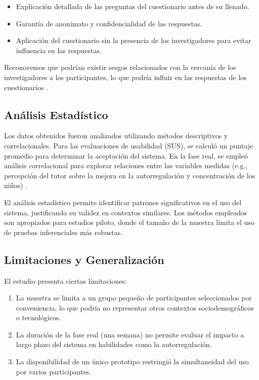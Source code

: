 \documentclass[a4paper,fleqn]{cas-sc}
\begin{document}
			\begin{itemize}
				\item Explicación detallada de las preguntas del cuestionario antes de su llenado.
				\item Garantía de anonimato y confidencialidad de las respuestas.
				\item Aplicación del cuestionario sin la presencia de los investigadores para evitar influencia en las respuestas.
			\end{itemize}
				
			Reconocemos que podrían existir sesgos relacionados con la cercanía de los investigadores a los participantes, lo que podría influir en las respuestas de los cuestionarios \citep{DiPietro2025Meta}.
			
		\subsection{Análisis Estadístico}
			Los datos obtenidos fueron analizados utilizando métodos descriptivos y correlacionales. Para las evaluaciones de usabilidad (SUS), se calculó un puntaje promedio para determinar la aceptación del sistema. En la fase real, se empleó análisis correlacional para explorar relaciones entre las variables medidas (e.g., percepción del tutor sobre la mejora en la autorregulación y concentración de los niños) \citep{Wang2025Development}.
				
			El análisis estadístico permite identificar patrones significativos en el uso del sistema, justificando su validez en contextos similares. Los métodos empleados son apropiados para estudios piloto, donde el tamaño de la muestra limita el uso de pruebas inferenciales más robustas.
			
		\subsection{Limitaciones y Generalización}
			El estudio presenta ciertas limitaciones:
				
			\begin{enumerate}
				\item La muestra se limita a un grupo pequeño de participantes seleccionados por conveniencia, lo que podría no representar otros contextos sociodemográficos o tecnológicos.
				\item La duración de la fase real (una semana) no permite evaluar el impacto a largo plazo del sistema en habilidades como la autorregulación.
				\item La disponibilidad de un único prototipo restringió la simultaneidad del uso por varios participantes.
			\end{enumerate}
		
\end{document}

